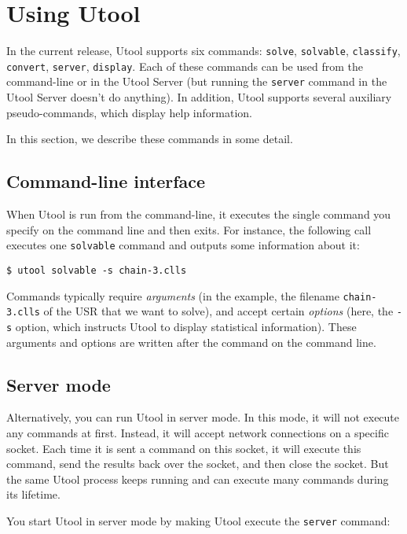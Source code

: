 \section{Using Utool}  \label{sec:operations}

In the current release, Utool supports six commands: \verb?solve?,
\verb?solvable?, \verb?classify?, \verb?convert?, \verb?server?,
\verb?display?. Each of these commands can be used from the
command-line or in the Utool Server (but running the \verb?server?
command in the Utool Server doesn't do anything). In addition, Utool
supports several auxiliary pseudo-commands, which display help
information. 

In this section, we describe these commands in some detail.


\subsection{Command-line interface}
When Utool is run from the command-line, it executes the single
command you specify on the command line and then exits. For instance,
the following call executes one \verb?solvable? command and outputs
some information about it:

\begin{verbatim}
$ utool solvable -s chain-3.clls
\end{verbatim}

Commands typically require \emph{arguments} (in the example, the
filename \verb?chain-3.clls? of the USR that we want to solve), and
accept certain \emph{options} (here, the \verb?-s? option, which
instructs Utool to display statistical information). These arguments
and options are written after the command on the command line.


\subsection{Server mode}

Alternatively, you can run Utool in server mode. In this mode, it will
not execute any commands at first. Instead, it will accept network
connections on a specific socket. Each time it is sent a command on
this socket, it will execute this command, send the results back over
the socket, and then close the socket. But the same Utool process
keeps running and can execute many commands during its lifetime. 

You start Utool in server mode by making Utool execute the
\verb?server? command:

